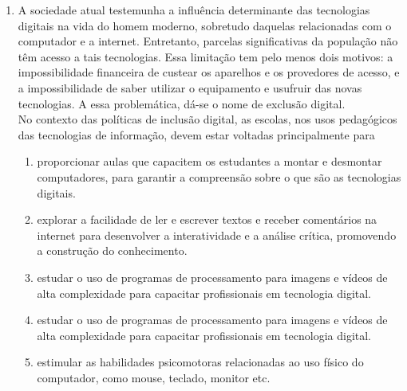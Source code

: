 \documentclass[10pt,a4paper]{article}
\begin{document}
\begin{multicols}{2}
\begin{enumerate}
		\begin{enumerate}
		\item a palavra ``mas" (em it\'alico) contradiz a afirma\c{c}\~ao inicial do texto: linhas 1 e 2.
		\item a palavra ``embora" (em  it\'alico) introduz uma explica\c{c}\~ao que n\~ao encontra complemento no restante do texto.
		\item as express\~oes: ``consequ\^encias calamitosas", na linha 2, e ``efeitos incalcul\'aveis", na linha 6, refor\c{c}am a ideia que perpassa o texto sobre o perigo do efeito estufa.
		\item o uso da palavra ``cientistas" (em it\'alico) \'e desnecess\'ario para dar credibilidade ao texto, uma vez que se fala em ``estudo" no t\'itulo do texto.
		\item a palavra ``g\'as" (em it\'alico), refere-se a ``combust\'iveis f\'osseis" e "queimadas", nas linhas primeiras linhas do texto, refor\c{c}ando a ideia de cat\'astrofe.
		\end{enumerate}

	\item A sociedade atual testemunha a influ\^encia determinante das tecnologias digitais na vida do homem moderno, sobretudo daquelas relacionadas com o computador e a internet. Entretanto, parcelas significativas da popula\c{c}\~ao n\~ao t\^em acesso a tais tecnologias. Essa limita\c{c}\~ao tem pelo menos dois motivos: a impossibilidade financeira de custear os aparelhos e os provedores de acesso, e a impossibilidade de saber utilizar o equipamento e usufruir das novas tecnologias. A essa problem\'atica, d\'a-se o nome de exclus\~ao digital. \\
No contexto das pol\'iticas de inclus\~ao digital, as escolas, nos usos pedag\'ogicos das tecnologias de informa\c{c}\~ao, devem estar voltadas principalmente para 
		\begin{enumerate}
		\item  proporcionar aulas que capacitem os estudantes a montar e desmontar computadores, para garantir a compreens\~ao sobre o que s\~ao as tecnologias digitais.
		\item  explorar a facilidade de ler e escrever textos e receber coment\'arios na internet para desenvolver a interatividade e a an\'alise cr\'itica, promovendo a constru\c{c}\~ao do conhecimento.
		\item estudar o uso de programas de processamento para imagens e v\'ideos de alta complexidade para capacitar profissionais em tecnologia digital.
		\item estudar o uso de programas de processamento para imagens e v\'ideos de alta complexidade para capacitar profissionais em tecnologia digital.
		\item  estimular as habilidades psicomotoras relacionadas ao uso f\'isico do computador, como mouse, teclado, monitor etc.
		\end{enumerate}


\end{enumerate}
\end{multicols}
\end{document}
